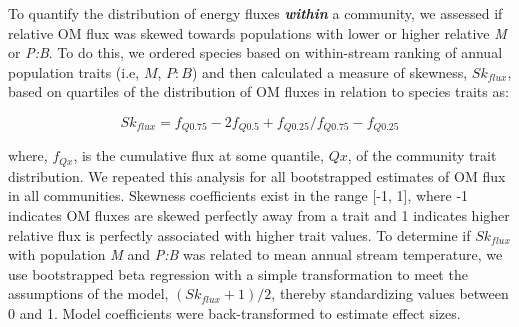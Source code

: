 \documentclass[
]{article}
\begin{document}
To quantify the distribution of energy fluxes \emph{\textbf{within}} a
community, we assessed if relative OM flux was skewed towards
populations with lower or higher relative \emph{M} or \emph{P:B}. To do
this, we ordered species based on within-stream ranking of annual
population traits (i.e, \(M\), \(P:B\)) and then calculated a measure of
skewness, \(Sk_{flux}\), based on quartiles of the distribution of OM
fluxes in relation to species traits as:

\[Sk_{flux} = f_{Q0.75} - 2f_{Q0.5} + f_{Q0.25}/ f_{Q0.75}-f_{Q0.25}\]

where, \(f_{Qx}\), is the cumulative flux at some quantile, \(Qx\), of
the community trait distribution. We repeated this analysis for all
bootstrapped estimates of OM flux in all communities. Skewness
coefficients exist in the range {[}-1, 1{]}, where -1 indicates OM
fluxes are skewed perfectly away from a trait and 1 indicates higher
relative flux is perfectly associated with higher trait values. To
determine if \(Sk_{flux}\) with population \emph{M} and \emph{P:B} was
related to mean annual stream temperature, we use bootstrapped beta
regression with a simple transformation to meet the assumptions of the
model, \((Sk_{flux} + 1)/2\), thereby standardizing values between 0 and
1. Model coefficients were back-transformed to estimate effect sizes.
\end{document}
